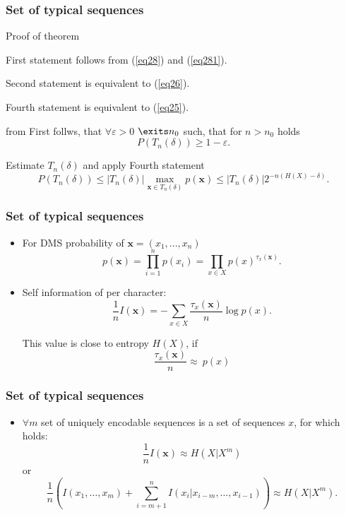 \documentclass[14pt]{beamer}
\renewcommand{\vec}[1]{\ensuremath{\boldsymbol{#1}}}
\begin{document}
\begin{frame}
\frametitle{Set of typical sequences}
Proof of theorem
\begin{itemize}
\small{  
    \item First statement follows from (\ref{eq28}) and (\ref{eq281}). 
    \item Second statement is equivalent to (\ref{eq26}).
    \item  Fourth statement is equivalent to (\ref{eq25}).
    
    
    \item from First follws, that  $\forall \varepsilon > 0$ $\exits n_0 $ such, that for $n > n_0 $ holds
    \begin{equation}
    \label{eq37}
    P\left( {T_n (\delta )} \right) \ge 1 - \varepsilon .
    \end{equation}

    \item Estimate $T_n (\delta )$ and apply Fourth statement
    \begin{equation}
    \label{eq38} P\left( {T_n (\delta )} \right) \le \left| {T_n
    (\delta )} \right|\mathop {\max }\limits_{\vec x \in T_n (\delta
    )} p(\vec x) \le \left| {T_n (\delta )} \right|2^{ - n(H(X) -
    \delta )}.
    \end{equation}
}
\end{itemize}
\end{frame}



\begin{frame}
\frametitle{Set of typical sequences}
\begin{itemize}
    \item For DMS probability of $\vec x = (x_1 ,...,x_n )$ 
    \[
    p(\vec x) = \prod\limits_{i = 1}^n {p(x_i ) = \prod\limits_{x \in
    X} {p(x)^{\tau _x (\vec x)}} } .
    \]

    \item Self information of per character:
    \[
    \frac{1}{n}I(\vec x) = - \sum\limits_{x \in X} {\frac{\tau _x
    (\vec x)}{n}\log p(x)} .
    \]

    \iten This value is close to entropy $H(X)$, if
    \[
    {\frac{\tau _x (\vec x)}{n} \approx \ p(x)}
    \]
\end{itemize}
\end{frame}



\begin{frame}
\frametitle{Set of typical sequences}
\begin{itemize}

    \item $\forall m$ set of uniquely encodable sequences is a set of sequences $x$, for which holds:
    \[
    \frac{1}{n} I(\vec x)\approx H(X|X^m)
    \]
    or
    \small{
    \[
    \frac{1}{n}\left( I(x_1,\dots,x_m)+\sum_{i=m+1}^{n}
    I(x_i|x_{i-m},\dots,x_{i-1}) \right) \approx H(X|X^m).
    \]  
    }
\end{itemize}
\end{frame}
\end{document}
